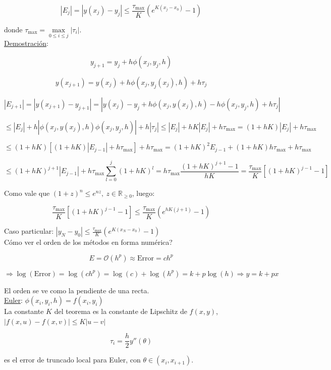 $$|E_{j}| = |y(x_{j}) - y_{j}| \leq \frac{\tau_{\max}}{K}(e^{K(x_{j} - x_{0})} - 1)$$

donde $\tau_{\max} = \max \limits_{0 \leq i \leq j} |\tau_{i}|$.\\

\underline{Demostraci\'on}:

$$y_{j + 1} = y_{j} + h\phi(x_{j}, y_{j}, h)$$

$$y(x_{j + 1}) = y(x_{j}) + h\phi(x_{j}, y_{j}(x_{j}), h) + h\tau_{j}$$

$$|E_{j + 1}| = |y(x_{j + 1}) - y_{j + 1}| = |y(x_{j}) - y_{j} + h\phi(x_{j}, y(x_{j}), h) - h\phi(x_{j}, y_{j}, h) + h\tau_{j}|$$

$$\leq |E_{j}| + h|\phi(x_{j}, y(x_{j}), h) \phi(x_{j}, y_{j}, h)| + h|\tau_{j}| \leq |E_{j}| + hK|E_{j}| + h\tau_{\max} = (1 + hK)|E_{j}| + h\tau_{\max}$$

$$\leq (1 + hK)[(1 + hK)|E_{j - 1}| + h\tau_{\max}] + h\tau_{\max} = (1 + hK)^{2}E_{j - 1} + (1 + hK)h\tau_{\max} + h\tau_{\max}$$

$$\leq (1 + hK)^{j + 1}|E_{j - 1}| + h\tau_{\max}\sum \limits_{l = 0}^{j} (1 + hK)^{l} = h\tau_{\max} \frac{(1 + hK)^{j + 1} - 1}{hK} = \frac{\tau_{\max}}{K}[(1 + hK)^{j - 1} - 1]$$

Como vale que $(1 + z)^{n} \leq e^{nz},\ z \in \mathbb{R}_{\geq 0}$, luego:

$$\frac{\tau_{\max}}{K}[(1 + hK)^{j - 1} - 1] \leq \frac{\tau_{\max}}{K}(e^{hK(j + 1)} - 1)$$

Caso particular: $|y_{N} - y_{0}| \leq \frac{\tau_{\max}}{K}(e^{K(x_{N} - x_{0})} - 1)$\\

C\'omo ver el orden de los m\'etodos en forma num\'erica?

$$E = \mathcal{O}(h^{p}) \approx \text{Error} = ch^{p}$$

$$\Rightarrow \log(\text{Error}) = \log(ch^{p}) = \log(c) + \log(h^{p}) = k + p\log(h) \Rightarrow y = k + px$$

El orden se ve como la pendiente de una recta.\\

\underline{Euler}: $\phi(x_{i}, y_{i}, h) = f(x_{i}, y_{i})$\\

La constante $K$ del teorema es la constante de Lipschitz de $f(x, y)$, $|f(x, u) - f(x, v)| \leq K|u - v|$

$$\tau_{i} = \frac{h}{2}y''(\theta)$$

es el error de truncado local para Euler, con $\theta \in (x_{i}, x_{i + 1})$.\\


